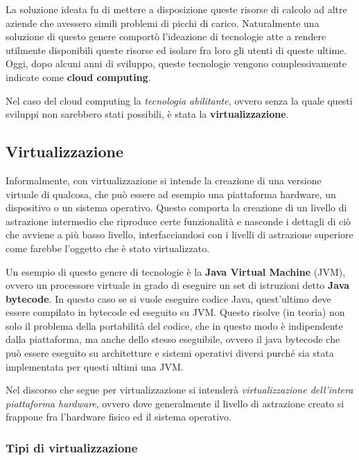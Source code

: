 \documentclass[italian,]{article}
\begin{document}
La soluzione ideata fu di mettere a disposizione queste risorse di
calcolo ad altre aziende che avessero simili problemi di picchi di
carico. Naturalmente una soluzione di questo genere comportò l'ideazione
di tecnologie atte a rendere utilmente disponibili queste risorse ed
isolare fra loro gli utenti di queste ultime. Oggi, dopo alcuni anni di
sviluppo, queste tecnologie vengono complessivamente indicate come
\textbf{cloud computing}.

Nel caso del cloud computing la \emph{tecnologia abilitante}, ovvero
senza la quale questi sviluppi non sarebbero stati possibili, è stata la
\textbf{virtualizzazione}.

\subsection{Virtualizzazione}\label{virtualizzazione}

Informalmente, con virtualizzazione si intende la creazione di una
versione virtuale di qualcosa, che può essere ad esempio una piattaforma
hardware, un dispositivo o un sistema operativo. Questo comporta la
creazione di un livello di astrazione intermedio che riproduce certe
funzionalità e nasconde i dettagli di ciò che avviene a più basso
livello, interfacciandosi con i livelli di astrazione superiore come
farebbe l'oggetto che è stato virtualizzato.

Un esempio di questo genere di tecnologie è la \textbf{Java Virtual
Machine} (JVM), ovvero un processore virtuale in grado di eseguire un
set di istruzioni detto \textbf{Java bytecode}. In questo caso se si
vuole eseguire codice Java, quest'ultimo deve essere compilato in
bytecode ed eseguito su JVM. Questo risolve (in teoria) non solo il
problema della portabilità del codice, che in questo modo è indipendente
dalla piattaforma, ma anche dello stesso eseguibile, ovvero il java
bytecode che può essere eseguito su architetture e sistemi operativi
diversi purché sia stata implementata per questi ultimi una JVM.

Nel discorso che segue per virtualizzazione si intenderà
\emph{virtualizzazione dell'intera piattaforma hardware}, ovvero dove
generalmente il livello di astrazione creato si frappone fra l'hardware
fisico ed il sistema operativo.

\subsubsection{Tipi di virtualizzazione}\label{tipi-di-virtualizzazione}
\end{document}
